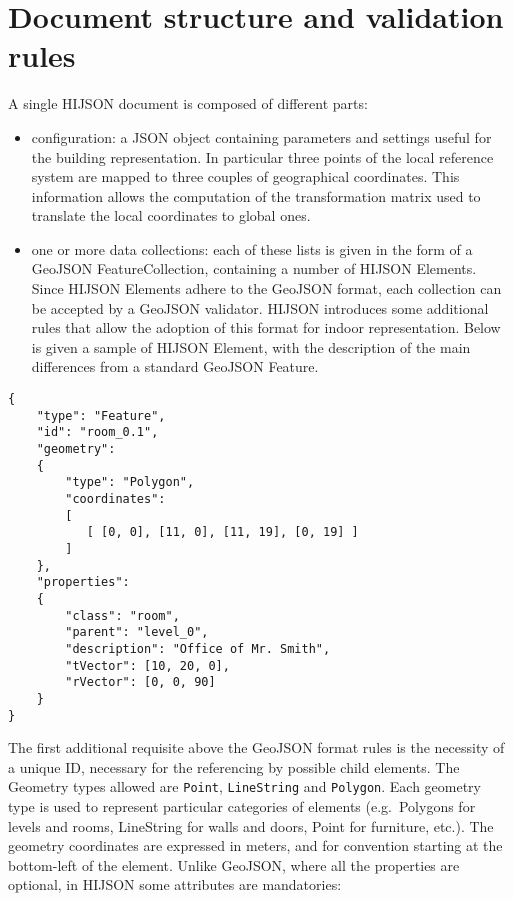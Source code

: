 \documentclass[]{article}
\begin{document}
\section{Document structure and validation
rules}\label{document-structure-and-validation-rules}

A single HIJSON document is composed of different parts:

\begin{itemize}
\itemsep1pt\parskip0pt
\item
  configuration: a JSON object containing parameters and settings useful
  for the building representation. In particular three points of the
  local reference system are mapped to three couples of geographical
  coordinates. This information allows the computation of the
  transformation matrix used to translate the local coordinates to
  global ones.
\item
  one or more data collections: each of these lists is given in the form
  of a GeoJSON FeatureCollection, containing a number of HIJSON
  Elements. Since HIJSON Elements adhere to the GeoJSON format, each
  collection can be accepted by a GeoJSON validator. HIJSON introduces
  some additional rules that allow the adoption of this format for
  indoor representation. Below is given a sample of HIJSON Element, with
  the description of the main differences from a standard GeoJSON
  Feature.
\end{itemize}

\begin{verbatim}
{
    "type": "Feature",
    "id": "room_0.1",
    "geometry": 
    {
        "type": "Polygon",
        "coordinates": 
        [ 
           [ [0, 0], [11, 0], [11, 19], [0, 19] ]
        ]    
    },
    "properties": 
    {
        "class": "room",
        "parent": "level_0",
        "description": "Office of Mr. Smith",
        "tVector": [10, 20, 0],
        "rVector": [0, 0, 90]
    }
}
\end{verbatim}

The first additional requisite above the GeoJSON format rules is the
necessity of a unique ID, necessary for the referencing by possible
child elements. The Geometry types allowed are \texttt{Point},
\texttt{LineString} and \texttt{Polygon}. Each geometry type is used to
represent particular categories of elements (e.g.~Polygons for levels
and rooms, LineString for walls and doors, Point for furniture, etc.).
The geometry coordinates are expressed in meters, and for convention
starting at the bottom-left of the element. Unlike GeoJSON, where all
the properties are optional, in HIJSON some attributes are mandatories:
\end{document}

